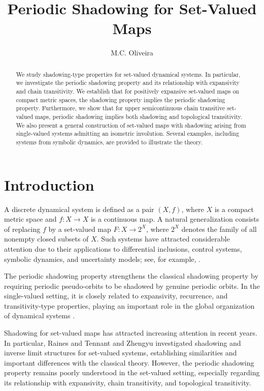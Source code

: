 \documentclass{amsart}
\title{Periodic Shadowing for Set-Valued Maps}
\author[M. Oliveira]{M.C. Oliveira}
\theoremstyle{definition}
\begin{document}
\begin{abstract}
We study shadowing-type properties for set-valued dynamical systems. In particular, we investigate the periodic shadowing property and its relationship with expansivity and chain transitivity. We establish that for positively expansive set-valued maps on compact metric spaces, the shadowing property implies the periodic shadowing property. Furthermore, we show that for upper semicontinuous chain transitive set-valued maps, periodic shadowing implies both shadowing and topological transitivity. We also present a general construction of set-valued maps with shadowing arising from single-valued systems admitting an isometric involution. Several examples, including systems from symbolic dynamics, are provided to illustrate the theory.
\end{abstract}

\maketitle

\section{Introduction}

A discrete dynamical system is defined as a pair $(X,f)$, where $X$ is a compact metric space and $f:X\to X$ is a continuous map. A natural generalization consists of replacing $f$ by a set-valued map $F:X\to 2^X$, where $2^X$ denotes the family of all nonempty closed subsets of $X$. Such systems have attracted considerable attention due to their applications to differential inclusions, control systems, symbolic dynamics, and uncertainty models; see, for example, \cite{Guzik2017,RT,CordeiroPacifico2016,HuangLiang2017}.

The periodic shadowing property strengthens the classical shadowing property by requiring periodic pseudo-orbits to be shadowed by genuine periodic orbits. In the single-valued setting, it is closely related to expansivity, recurrence, and transitivity-type properties, playing an important role in the global organization of dynamical systems \cite{Koscielniak1996,Koscielniak2005,DarabiForouzanfar2017,OsipovPilyuginTikhomirov2010,Lee2013}.

Shadowing for set-valued maps has attracted increasing attention in recent years. In particular, Raines and Tennant \cite{RT} and Zhengyu \cite{Zhengyu} investigated shadowing and inverse limit structures for set-valued systems, establishing similarities and important differences with the classical theory. However, the periodic shadowing property remains poorly understood in the set-valued setting, especially regarding its relationship with expansivity, chain transitivity, and topological transitivity.
\end{document}
